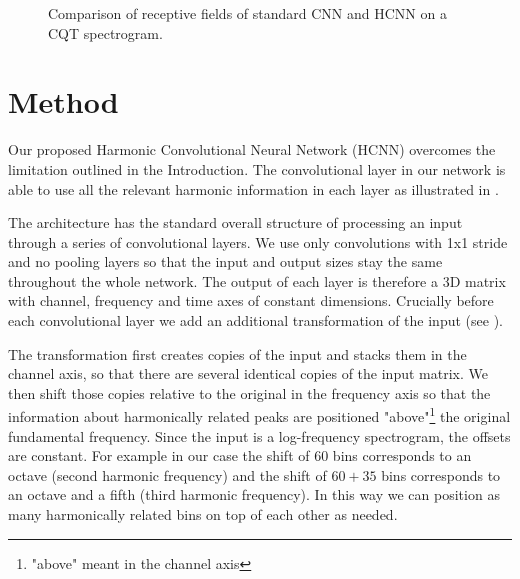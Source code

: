 \documentclass{article}
\begin{document}
\begin{figure}
 \centerline{}
 \caption{Comparison of receptive fields of standard CNN and HCNN on a CQT spectrogram.}
 \label{fig:vibrato}
\end{figure}

\section{Method}\label{sec:method}

Our proposed Harmonic Convolutional Neural Network (HCNN) overcomes the limitation outlined in the Introduction. The convolutional layer in our network is able to use all the relevant harmonic information in each layer as illustrated in . 

The architecture has the standard overall structure of processing an input through a series of convolutional layers. We use only convolutions with 1x1 stride and no pooling layers so that the input and output sizes stay the same throughout the whole network. The output of each layer is therefore a 3D matrix with channel, frequency and time axes of constant dimensions. Crucially before each convolutional layer we add an additional transformation of the input (see ). 

The transformation first creates copies of the input and stacks them in the channel axis, so that there are several identical copies of the input matrix. We then shift those copies relative to the original in the frequency axis so that the information about harmonically related peaks are positioned "above"\footnote{"above" meant in the channel axis} the original fundamental frequency. Since the input is a log-frequency spectrogram, the offsets are constant. For example in our case the shift of $60$ bins corresponds to an octave (second harmonic frequency) and the shift of $60+35$ bins corresponds to an octave and a fifth (third harmonic frequency). In this way we can position as many harmonically related bins on top of each other as needed. 
\end{document}
